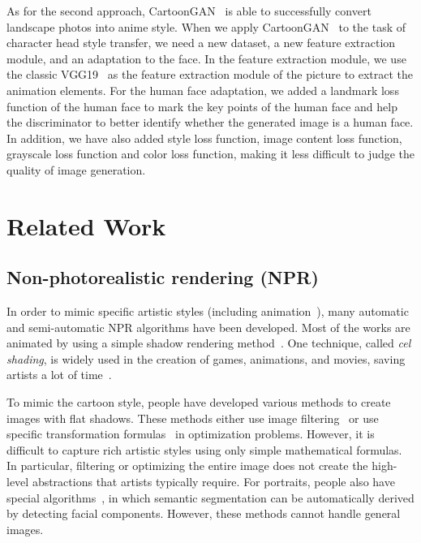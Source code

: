 \documentclass[10pt,twocolumn,letterpaper]{article}
\begin{document}
As for the second approach, CartoonGAN~\cite{CartoonGAN} is able to successfully convert landscape photos
into anime style. When we apply CartoonGAN~\cite{CartoonGAN} to the task of character head style transfer,
we need a new dataset, a new feature extraction module, and an adaptation to the face.
In the feature extraction module, we use the classic VGG19~\cite{VGG} as the feature extraction
module of the picture to extract the animation elements. For the human face adaptation,
we added a landmark loss function of the human face to mark the key points of the human face and
help the discriminator to better identify whether the generated image is a human face. In addition,
we have also added style loss function, image content loss function,
grayscale loss function and color loss function, making it less difficult to
judge the quality of image generation.

\section{Related Work}

\subsection{Non-photorealistic rendering (NPR)}
In order to mimic specific artistic styles (including animation~\cite{rosin2012image}), many automatic and
semi-automatic NPR algorithms have been developed. Most of the works are animated by
using a simple shadow rendering method~\cite{saito1990comprehensible}. One technique, called  \textsl{cel shading}, is widely
used in the creation of games, animations, and movies, saving artists a lot of time~\cite{luque2012cel}.

To mimic the cartoon style, people have developed various methods to create
images with flat shadows. These methods either use image filtering~\cite{winnemoller2006real} or use specific
transformation formulas~\cite{xu2011image} in optimization problems. However, it is difficult to
capture rich artistic styles using only simple mathematical formulas. In
particular, filtering or optimizing the entire image does not create the
high-level abstractions that artists typically require. For portraits, people
also have special algorithms~\cite{yang2010semantics, rosin2015non}, in which semantic segmentation can be automatically
derived by detecting facial components. However, these methods cannot handle general images.
\end{document}
